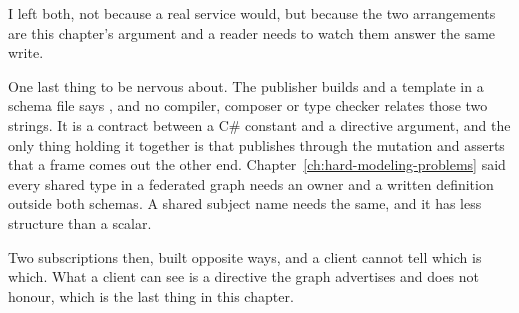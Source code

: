 I left both, not because a real service would, but because the two
arrangements are this chapter's argument and a reader needs to watch them
answer the same write.

%
One last thing to be nervous about. The publisher builds
 and a template in a schema file says
, and no compiler, composer or
type checker relates those two strings. It is a contract between a C\# constant
and a directive argument, and the only thing holding it together is that
 publishes through the mutation and asserts
that a frame comes out the other end. Chapter~\ref{ch:hard-modeling-problems}
said every shared type in a federated graph needs an owner and a written
definition outside both schemas. A shared subject name needs the same, and it
has less structure than a scalar.

\medskip
Two subscriptions then, built opposite ways, and a client cannot tell which is
which. What a client can see is a directive the graph advertises and does not
honour, which is the last thing in this chapter.

%
